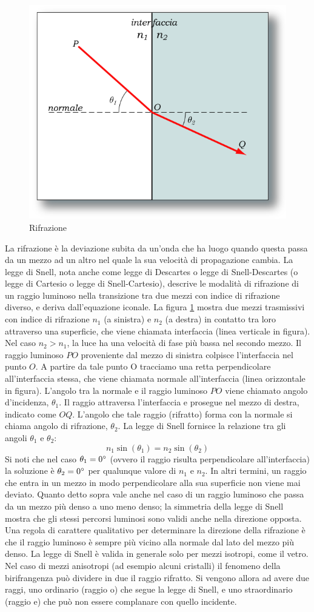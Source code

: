 \begin{figure}
\centering
\includegraphics[width=.5\textwidth]{img/Legge_di_Snell.png}
\caption{Rifrazione}\label{fig:snell}
\end{figure}

La rifrazione è la deviazione subita da un'onda che ha luogo quando questa passa da un mezzo ad un altro 
nel quale la sua velocità di propagazione cambia.
La legge di Snell, nota anche come legge di Descartes o legge di Snell-Descartes (o legge di Cartesio o legge di Snell-Cartesio), descrive le modalità di rifrazione di un raggio luminoso nella transizione tra due mezzi con indice di rifrazione diverso, e deriva dall'equazione iconale.
La figura \ref{fig:snell} mostra due mezzi trasmissivi con indice di rifrazione $n_1$ (a sinistra) e $n_2$ (a destra) in contatto tra loro attraverso una superficie, che viene chiamata interfaccia (linea verticale in figura). Nel caso $n_2 > n_1$, la luce ha una velocità di fase più bassa nel secondo mezzo.
Il raggio luminoso $PO$ proveniente dal mezzo di sinistra colpisce l'interfaccia nel punto $O$. A partire da tale punto O tracciamo una retta perpendicolare all'interfaccia stessa, che viene chiamata normale all'interfaccia (linea orizzontale in figura). L'angolo tra la normale e il raggio luminoso $PO$ viene chiamato angolo d'incidenza, $\theta_1$.
Il raggio attraversa l'interfaccia e prosegue nel mezzo di destra, indicato come $OQ$. L'angolo che tale raggio (rifratto) forma con la normale si chiama angolo di rifrazione, $\theta_2$.
La legge di Snell fornisce la relazione tra gli angoli $\theta_1$ e $\theta_2$:
\[n_1 \sin(\theta_1)=n_2 \sin(\theta_2)\]
Si noti che nel caso $\theta_1 = 0^\circ$ (ovvero il raggio risulta perpendicolare all'interfaccia) la soluzione è $\theta_2 = 0^\circ$ per qualunque valore di $n_1$ e $n_2$. In altri termini, un raggio che entra in un mezzo in modo perpendicolare alla sua superficie non viene mai deviato.
Quanto detto sopra vale anche nel caso di un raggio luminoso che passa da un mezzo più denso a uno meno denso; la simmetria della legge di Snell mostra che gli stessi percorsi luminosi sono validi anche nella direzione opposta.
Una regola di carattere qualitativo per determinare la direzione della rifrazione è che il raggio luminoso è sempre più vicino alla normale dal lato del mezzo più denso.
La legge di Snell è valida in generale solo per mezzi isotropi, come il vetro. Nel caso di mezzi anisotropi (ad esempio alcuni cristalli) il fenomeno della birifrangenza può dividere in due il raggio rifratto. Si vengono allora ad avere due raggi, uno ordinario (raggio o) che segue la legge di Snell, e uno straordinario (raggio e) che può non essere complanare con quello incidente.

